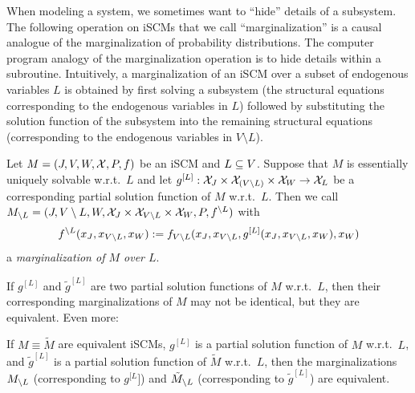 When modeling a system, we sometimes want to ``hide'' details of a subsystem. 
The following operation on iSCMs that we call ``marginalization'' is a causal analogue of the marginalization of probability distributions.
The computer program analogy of the marginalization operation is to hide details within a subroutine.
Intuitively, a marginalization of an iSCM over a subset of endogenous variables $L$ is obtained by first solving a subsystem (the structural equations corresponding to the endogenous variables in $L$) followed by substituting the solution function of the subsystem into the remaining structural equations (corresponding to the endogenous variables in $V\setminus L$).
\begin{Def}\label{def:scm_marginalization}
  Let $M = \left ( J, V, W, \mathcal{X}, P, f \right )$ be an iSCM and $L \subseteq V$.
  Suppose that $M$ is essentially uniquely solvable w.r.t.\ $L$ and let $g^{[L]} : \mathcal{X}_J \times \mathcal{X}_{(V\setminus L)} \times \mathcal{X}_W \to \mathcal{X}_L$ be a corresponding partial solution function of $M$ w.r.t.\ $L$.
  Then we call $M_{\setminus L} = ( J, V \setminus L, W, \mathcal{X}_{J} \times \mathcal{X}_{V \setminus L} \times \mathcal{X}_{W}, P, f^{\setminus L} )$ with
  $$f^{\setminus L}(x_{J},x_{V \setminus L},x_{W}) := f_{V \setminus L}(x_{J},x_{V \setminus L},g^{[L]}(x_{J},x_{V \setminus L},x_{W}),x_{W})$$
  a \emph{marginalization of $M$ over $L$}.
\end{Def}
If $g^{[L]}$ and $\tilde g^{[L]}$ are two partial solution functions of $M$ w.r.t.\ $L$, then their corresponding marginalizations of $M$ may not be identical, but they are equivalent. Even more:
\begin{Prp}\label{prp:scm_marginalization_equivalence}
  If $M \equiv \tilde{M}$ are equivalent iSCMs, $g^{[L]}$ is a partial solution function of $M$ w.r.t.\ $L$, and $\tilde g^{[L]}$ is a partial solution function of $\tilde{M}$ w.r.t.\ $L$, then the marginalizations $M_{\setminus L}$ (corresponding to $g^{[L}]$) and $\tilde{M}_{\setminus L}$ (corresponding to $\tilde g^{[L]}$) are equivalent.
\end{Prp}
